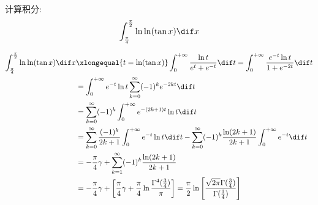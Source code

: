 \documentclass[color=green,titlestyle=hang]{elegantbook}%
\begin{document}
\begin{exercise}
计算积分:
\[\int_{\frac{\pi}{4}}^{\frac{\pi}{2}}\ln\ln(\tan x)\dif x\]
\end{exercise}\begin{solution}
\begin{align*}
\int_{\frac{\pi}{4}}^{\frac{\pi}{2}}\ln\ln(\tan x)\dif x
&\xlongequal{t=\ln(\tan x)}\int_0^{+\infty}\frac{\ln t}{e^t+e^{-t}}\dif t=\int_0^{+\infty}\frac{e^{-t}\ln t}{1+e^{-2t}}\dif t\\
&=\int_0^{+\infty}e^{-t}\ln t\sum_{k=0}^{\infty}(-1)^ke^{-2kt}\dif t\\
&=\sum_{k=0}^{\infty}(-1)^k\int_0^{+\infty}e^{-(2k+1)t}\ln t\dif t\\
&=\sum_{k=0}^{\infty}\frac{(-1)^k}{2k+1}\int_0^{+\infty}e^{-t}\ln t\dif t-\sum_{k=0}^{\infty}(-1)^k\frac{\ln(2k+1)}{2k+1}\int_0^{+\infty}e^{-t}\dif t\\
&=-\frac{\pi}{4}\gamma+\sum_{k=1}^{\infty}(-1)^k\frac{\ln(2k+1)}{2k+1}\\
&=-\frac{\pi}{4}\gamma+\left[\frac{\pi}{4}\gamma+\frac{\pi}{4}\ln\frac{\Gamma^4(\tfrac{3}{4})}{\pi}\right]=\frac{\pi}{2}\ln\left[\frac{\sqrt{2\pi}\Gamma(\tfrac{3}{4})}{\Gamma(\tfrac{1}{4})}\right]
\end{align*}
\end{solution}
\end{document}
